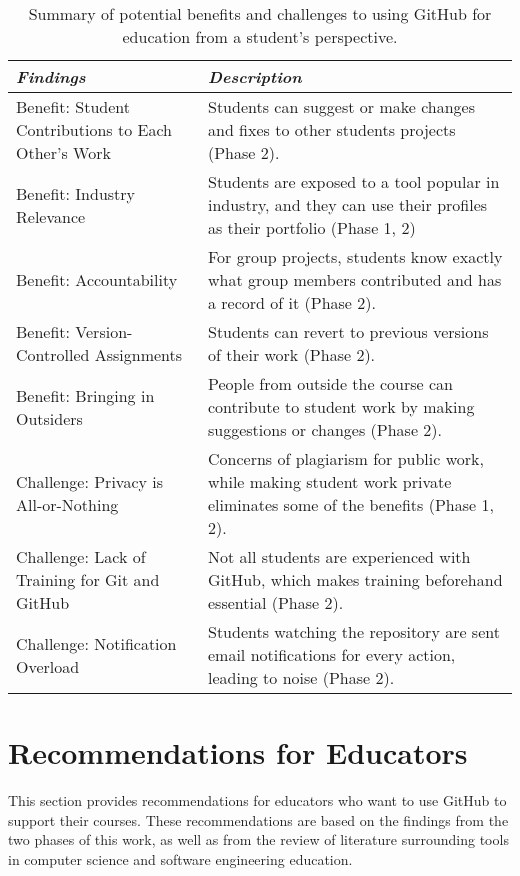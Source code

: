 \begin{table}[htp]
    \vspace{1pt}
        \caption{Summary of potential benefits and challenges to using GitHub for education from a student's perspective.}\label{table:findings:students}
    \vspace{1pt}
    \begin{center}
        \begin{tabular}{ | m{3cm} | m{12cm} | }
            \hline
            \emph{Findings} & \emph{Description} \\
            \hline
            Benefit: Student Contributions to Each Other’s Work & Students can suggest or make changes and fixes to other students projects (Phase 2)​. \\
            \hline
            Benefit: Industry Relevance & Students are exposed to a tool popular in industry, and they can use their profiles as their portfolio (Phase 1, 2)​ \\
            \hline
            Benefit: Accountability & For group projects, students know exactly what group members contributed and has a record of it (Phase 2). \\
            \hline
            Benefit: Version-Controlled Assignments & Students can revert to previous versions of their work (Phase 2). \\
            \hline
            Benefit: Bringing in Outsiders & People from outside the course can contribute to student work by making suggestions or changes (Phase 2)​. \\
            \hline
            Challenge: Privacy is All-or-Nothing & Concerns of plagiarism for public work, while making student work private eliminates some of the benefits (Phase 1, 2)​. \\
            \hline
            Challenge: Lack of Training for Git and GitHub & Not all students are experienced with GitHub, which makes training beforehand essential (Phase 2)​. \\
            \hline
            Challenge: Notification Overload & Students watching the repository are sent email notifications for every action, leading to noise (Phase 2).​ \\
            \hline
        \end{tabular}
    \end{center}
\end{table}

\section{Recommendations for Educators}
This section provides recommendations for educators who want to use GitHub to support their courses. These recommendations are based on the findings from the two phases of this work, as well as from the review of literature surrounding tools in computer science and software engineering education.

